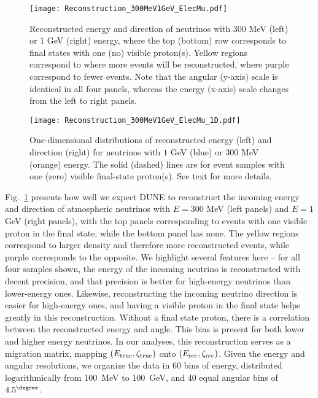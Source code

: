 \begin{figure}[t!]
\begin{center}
\texttt{[image: Reconstruction\_300MeV1GeV\_ElecMu.pdf]}
\caption{Reconstructed energy and direction of neutrinos with 300 MeV (left) or 1 GeV (right) energy, where the top (bottom) row corresponds to final states with one (no) visible proton(s). Yellow regions correspond to where more events will be reconstructed, where purple correspond to fewer events. Note that the angular (y-axis) scale is identical in all four panels, whereas the energy (x-axis) scale changes from the left to right panels. \label{fig:Reco2D}}
\end{center}
\end{figure}
\begin{figure}[b!]
\begin{center}
\texttt{[image: Reconstruction\_300MeV1GeV\_ElecMu\_1D.pdf]}
\caption{One-dimensional distributions of reconstructed energy (left) and direction (right) for neutrinos with $1$ GeV (blue) or $300$ MeV (orange) energy. The solid (dashed) lines are for event samples with one (zero) visible final-state proton(s). See text for more details. \label{fig:Reco1D}}
\end{center}
\end{figure}
Fig.~\ref{fig:Reco2D} presents how well we expect DUNE to reconstruct the incoming energy and direction of atmospheric neutrinos with $E = 300$ MeV (left panels) and $E = 1$ GeV (right panels), with the top  panels corresponding to events with one visible proton in the final state, while the bottom panel has none. The yellow regions correspond to larger  density and therefore more  reconstructed events, while purple corresponds to the opposite.
We highlight several features here -- for all four samples shown, the energy of the incoming neutrino is reconstructed with decent precision, and that precision is better for high-energy neutrinos than lower-energy ones. 
Likewise, reconstructing the incoming neutrino direction is easier for high-energy ones, and having a visible proton in the final state helps greatly in this reconstruction. 
Without a final state proton, there is a correlation between the reconstructed energy and angle.
This bias is present for both lower and higher energy neutrinos.
In our analyses, this reconstruction serves as a migration matrix, mapping $(E_{\rm true}, \zeta_{\rm true})$ onto $(E_{\rm rec}, \zeta_{\rm rec})$. 
Given the energy and angular resolutions, we organize the data in 60 bins of energy, distributed logarithmically from 100~MeV to 100~GeV, and 40 equal angular bins of $4.5^\degree$.

